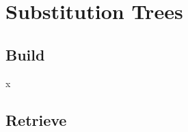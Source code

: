 

\section{Substitution Trees}
\subsection{Build}

\begin{frame}

\end{frame}
x
\subsection{Retrieve}
\begin{frame}

\end{frame}
